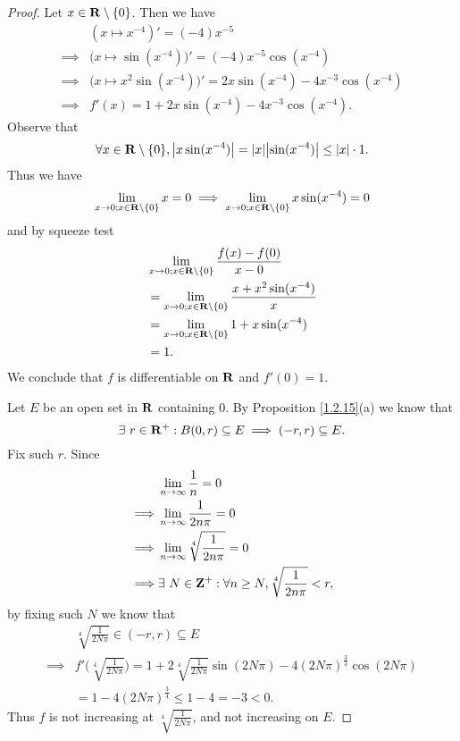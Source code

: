 \begin{proof}
    Let \(x \in \mathbf{R} \setminus \{0\}\).
    Then we have
    \begin{align*}
                 & (x \mapsto x^{-4})' = (-4) x^{-5}                                               \\
        \implies & \big(x \mapsto \sin(x^{-4})\big)' = (-4) x^{-5} \cos(x^{-4})                    \\
        \implies & \big(x \mapsto x^2 \sin(x^{-4})\big)' = 2x \sin(x^{-4}) - 4 x^{-3} \cos(x^{-4}) \\
        \implies & f'(x) = 1 + 2 x \sin(x^{-4}) - 4 x^{-3} \cos(x^{-4}).
    \end{align*}
    Observe that
    \[
        \forall x \in \R \setminus \{0\}, \abs{x \sin(x^{-4})} = \abs{x} \abs{\sin(x^{-4})} \leq \abs{x} \cdot 1.
    \]
    Thus we have
    \[
        \lim_{x \to 0 ; x \in \mathbf{R} \setminus \{0\}} x = 0 \implies \lim_{x \to 0 ; x \in \mathbf{R} \setminus \{0\}} x \sin(x^{-4}) = 0
    \]
    and by squeeze test
    \begin{align*}
         & \lim_{x \to 0 ; x \in \mathbf{R} \setminus \{0\}} \frac{f(x) - f(0)}{x - 0}        \\
         & = \lim_{x \to 0 ; x \in \mathbf{R} \setminus \{0\}} \frac{x + x^2 \sin(x^{-4})}{x} \\
         & = \lim_{x \to 0 ; x \in \mathbf{R} \setminus \{0\}} 1 + x \sin(x^{-4})             \\
         & = 1.
    \end{align*}
    We conclude that \(f\) is differentiable on \(\mathbf{R}\) and \(f'(0) = 1\).

    Let \(E\) be an open set in \(\mathbf{R}\) containing \(0\).
    By Proposition \ref{1.2.15}(a) we know that
    \[
        \exists\ r \in \mathbf{R}^+ : B(0, r) \subseteq E \implies (-r, r) \subseteq E.
    \]
    Fix such \(r\).
    Since
    \begin{align*}
                 & \lim_{n \to \infty} \frac{1}{n} = 0                                      \\
        \implies & \lim_{n \to \infty} \frac{1}{2 n \pi} = 0                                \\
        \implies & \lim_{n \to \infty} \sqrt[4]{\frac{1}{2 n \pi}} = 0                      \\
        \implies & \exists\ N \in \mathbf{Z}^+ : \forall n \geq N, \sqrt[4]{\frac{1}{2 n \pi}} < r,
    \end{align*}
    by fixing such \(N\) we know that
    \begin{align*}
                 & \sqrt[4]{\frac{1}{2 N \pi}} \in (-r, r) \subseteq E                                                                                   \\
        \implies & f'\bigg(\sqrt[4]{\frac{1}{2 N \pi}}\bigg) = 1 + 2 \sqrt[4]{\frac{1}{2 N \pi}} \sin(2 N \pi) - 4 (2 N \pi)^{\frac{3}{4}} \cos(2 N \pi) \\
                 & = 1 - 4 (2 N \pi)^{\frac{3}{4}} \leq 1 - 4 = -3 < 0.
    \end{align*}
    Thus \(f\) is not increasing at \(\sqrt[4]{\frac{1}{2 N \pi}}\), and not increasing on \(E\).
\end{proof}

